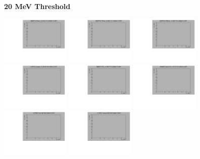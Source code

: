 \textbf{20 MeV Threshold}

\begin{center}

  \includegraphics[width=0.245\textwidth]{plots/response_matrix/Proton_KE_FHC_CC0Pi_20MeV.pdf}
  \includegraphics[width=0.245\textwidth]{plots/response_matrix/PiPlus_KE_FHC_CC0Pi_20MeV.pdf}
  \includegraphics[width=0.245\textwidth]{plots/response_matrix/PiMinus_KE_FHC_CC0Pi_20MeV.pdf}
  \includegraphics[width=0.245\textwidth]{plots/response_matrix/Charged_Pi_KE_FHC_CC0Pi_20MeV.pdf}
  \includegraphics[width=0.245\textwidth]{plots/response_matrix/Pi0_KE_FHC_CC0Pi_20MeV.pdf}
  \includegraphics[width=0.245\textwidth]{plots/response_matrix/Proton+Pion_KE_FHC_CC0Pi_20MeV.pdf}
  \includegraphics[width=0.245\textwidth]{plots/response_matrix/Total_FHC_CC0Pi_20MeV.pdf}
  \includegraphics[width=0.245\textwidth]{plots/response_matrix/Hadrons_FHC_CC0Pi_20MeV.pdf}

\end{center}

